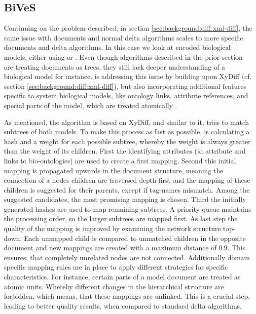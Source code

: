 	\subsection{BiVeS}
	\label{sec:background:diff:bives}
	Continuing on the problem described, in section \ref{sec:background:diff:xml-diff}, the same issue with \xml documents and normal delta algorithms scales to more specific documents and \xml delta algorithms. In this case we look at \xml encoded biological models, either using \cellml or \sbml. Even though algorithms described in the prior section are treating \xml documents as trees, they still lack deeper understanding of a biological model for instance. \bives is addressing this issue by building upon XyDiff (cf. section \ref{sec:background:diff:xml-diff}), but also incorporating additional features specific to system biological models, like ontology links, attribute references, and special parts of the model, which are treated atomically \citep{Scharm2015}.
	
	As mentioned, the \bives algorithm is based on XyDiff, and similar to it, \bives tries to match subtrees of both models. To make this process as fast as possible, \bives is calculating a hash and a weight for each possible subtree, whereby the weight is always greater than the weight of its children.
	First the identifying attributes (\xml id attribute and links to bio-ontologies) are used to create a first mapping. Second this initial mapping is propagated upwards in the document structure, meaning the connection of a nodes children are traversed depth-first and the mapping of these children is suggested for their parents, except if tag-names mismatch. Among the suggested candidates, the most promising mapping is chosen.
	Third the initially generated hashes are used to map remaining subtrees. A priority queue maintains the processing order, so the larger subtrees are mapped first.
	As last step the quality of the mapping is improved by examining the network structure top-down. Each unmapped child is compared to unmatched children in the opposite document and new mappings are created with a maximum distance of $0.9$. This ensures, that completely unrelated nodes are not connected.
	Additionally domain specific mapping rules are in place to apply different strategies for specific characteristics. For instance, certain parts of a model document are treated as atomic units. Whereby different changes in the hierarchical structure are forbidden, which means, that these mappings are unlinked. This is a crucial step, leading to better quality results, when compared to standard \xml delta algorithms.
	
